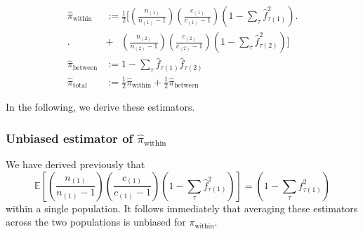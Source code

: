 \documentclass[a4paper,fontsize=9pt,DIV=14]{scrartcl}
\newcommand{\coverage}{c}
\newcommand{\empfreq}{\widehat{f}}
\begin{document}
\begin{align}
    \nonumber
    \widehat{\pi}_\text{within} &:=
        \frac{1}{2}
        \Bigg[                                 \left( \frac{n_{(1)}}{n_{(1)}-1} \right) \left( \frac{\coverage_{(1)}}{\coverage_{(1)}-1} \right) \left( 1 - \sum_{\tau} \empfreq_{\tau(1)}^2 \right) \Bigg. \\
        \Bigg. &+ \phantom{\frac{1}{2} \Bigg[} \left( \frac{n_{(2)}}{n_{(2)}-1} \right) \left( \frac{\coverage_{(2)}}{\coverage_{(2)}-1} \right) \left( 1 - \sum_{\tau} \empfreq_{\tau(2)}^2 \right) \Bigg] \\
    \widehat{\pi}_\text{between} &:=
        1 - \sum_{\tau} \empfreq_{\tau(1)}\empfreq_{\tau(2)} \\
    \widehat{\pi}_\text{total} &:=
        \frac{1}{2}\widehat{\pi}_\text{within} + \frac{1}{2}\widehat{\pi}_\text{between}
\end{align}

In the following, we derive these estimators.


\subsubsection*{Unbiased estimator of \texorpdfstring{$\widehat{\pi}_\text{within}$}{Pi Within}}
\label{supp:sec:FST:sub:EstimatorsPi:sub:PiWithin}

We have derived previously that
\[
\mathbb{E}\left[\left(\frac{n_{(1)}}{n_{(1)}-1}\right)\left(\frac{\coverage_{(1)}}{\coverage_{(1)}-1}\right)\left(1 - \sum_{\tau}\empfreq_{\tau(1)}^2\right) \right] = \left(1 - \sum_\tau f_{\tau(1)}^2\right)
\]
within a single population.  It follows immediately that averaging these estimators across the two populations is unbiased for $\pi_\text{within}$.
\end{document}
